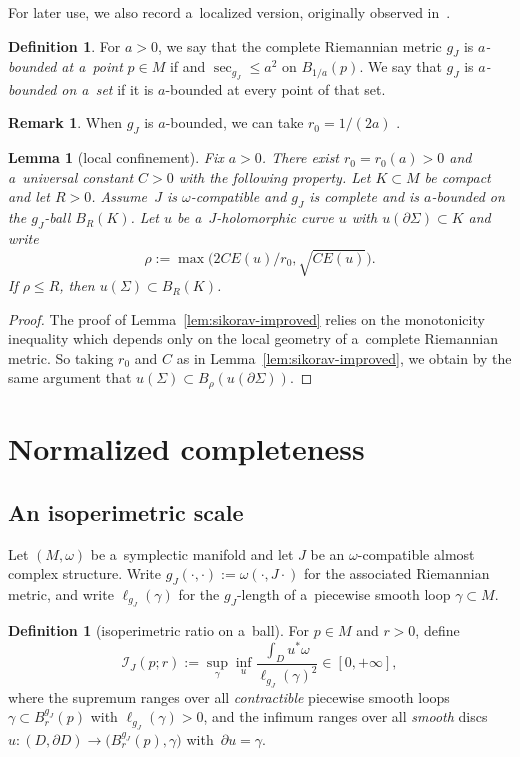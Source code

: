\documentclass[10pt,a4paper]{amsart}
\numberwithin{equation}{section}
\DeclareMathOperator{\inj}{inj}
\DeclareMathOperator{\Sec}{sec}
\newtheorem{lm}[Theorem]{Lemma}
\theoremstyle{definition}
\newtheorem{df}[Theorem]{Definition}
\newtheorem{rem}[Theorem]{Remark}
\begin{document}
For later use, we also record a~localized version, originally observed in~\cite{GromanFloerOpen}.
\begin{df}\label{df:a-bounded}
 For $a>0$, we say that the complete Riemannian metric $g_J$ is \emph{$a$-bounded at a~point} $p\in M$ if \smash{$\inj_{g_J}(p)\ge \frac{1}{a}$} and $\Sec_{g_J}\le a^{2}$ on $B_{1/a}(p)$. We say that $g_J$ is \emph{$a$-bounded on a~set} if it is $a$-bounded at every point of that set.
\end{df}
\begin{rem}
 When $g_J$ is $a$-bounded, we can take $r_0=1/(2a)$ \cite[Theorem 4.4.1 and Remark~4.4.3]{McDuffSalamonJHol}.
\end{rem}

\begin{lm}[local confinement]\label{lem:local-confinement}
Fix $a>0$. There exist $r_0=r_0(a)>0$ and a~universal constant $C>0$ with the following property. Let $K\subset M$ be compact and let $R>0$.
Assume~$J$ is $\omega$-compatible and $g_J$ is complete and is $a$-bounded on the $g_J$-ball $B_{R}(K)$.
Let $u$ be a~$J$-holomorphic curve $u$ with $u(\partial\Sigma)\subset K$ and write
\[
\rho:=\max\bigl(2CE(u)/r_0,\sqrt{CE(u)}\bigr).
\]
If $\rho\le R$, then $u(\Sigma)\subset B_R(K)$.
\end{lm}
\begin{proof}
The proof of Lemma~\ref{lem:sikorav-improved} relies on the monotonicity inequality which depends only on the local geometry of a~complete Riemannian metric. So taking $r_0$ and $C$ as in Lemma~\ref{lem:sikorav-improved}, we obtain by the same argument that
$
u(\Sigma)\subset B_{\rho}(u(\partial\Sigma))
$.
\end{proof}

\section{Normalized completeness}\label{sec:norm-complete}
\subsection{An isoperimetric scale}\label{subsec:isoperimetric-scale}
Let $(M,\omega)$ be a~symplectic manifold and let $J$ be an $\omega$-compatible almost complex structure.
Write
$
g_J(\cdot,\cdot):=\omega(\cdot,J\cdot)
$
for the associated Riemannian metric, and write $\ell_{g_J}(\gamma)$ for the $g_J$-length of a~piecewise smooth loop $\gamma\subset M$.

\begin{df}[isoperimetric ratio on a~ball]\label{df:isoperimetric-ratio}
For $p\in M$ and $r>0$, define
\[
\mathcal{I}_J(p;r)
:=
\sup_{\gamma}
\inf_{u}
\frac{\int_D u^*\omega}{\ell_{g_J}(\gamma)^2} \in[0,+\infty],
\]
where the supremum ranges over all \emph{contractible} piecewise smooth loops $\gamma\subset B^{g_J}_r(p)$ with $\ell_{g_J}(\gamma)>0$, and the infimum ranges over all \emph{smooth} discs $u\colon (D,\partial D)\to \bigl(B^{g_J}_r(p),\gamma\bigr)$ with~${\partial u=\gamma}$.
\end{df}
\end{document}
